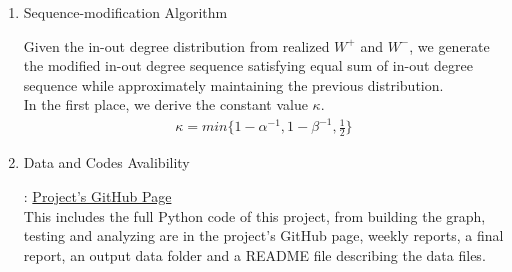 \documentclass{article}
\begin{document}
\begin{enumerate}
\item \hypertarget{eaual_sum_algo}{Sequence-modification Algorithm}
\par Given the in-out degree distribution from realized $W^{+}$ and $W^{-}$, we generate the modified in-out degree sequence satisfying equal sum of in-out degree sequence while approximately maintaining the previous distribution.\\
 In the first place, we derive the constant value $\kappa$. 
\begin{align*}
 \kappa = min\{ 1 - \alpha^{-1}, 1 - \beta^{-1}, \frac{1}{2} \}
 \end{align*}


\item \hypertarget{data_ava}{Data and Codes Avalibility}: \href{https://github.com/leahwu/DCM_simulaiton_and_analysis}{Project's GitHub Page}\\
This includes the full Python code of this project, from building the graph, testing and analyzing are in the project's GitHub page, weekly reports, a final report, an output data folder and a README file describing the data files.

\end{enumerate}
\end{document}
